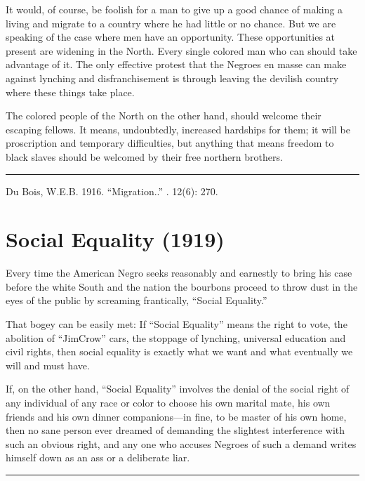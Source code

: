 \documentclass[letterpaper,10pt,english]{jupyterBook}
\begin{document}
\sphinxAtStartPar
It would, of course, be foolish for a man to give up a good chance of making a living and migrate to a country where he had little or no chance. But we are speaking of the case where men have an opportunity. These opportunities at present are widening in the North. Every single colored man who can should take advantage of it. The only effective protest that the Negroes en masse can make against lynching and dis­franchisement is through leaving the devilish country where these things take place.

\sphinxAtStartPar
The colored people of the North on the other hand, should welcome their escaping fellows. It means, undoubtedly, increased hardships for them; it will be proscription and temporary difficulties, but anything that means freedom to black slaves should be welcomed by their free northern brothers.


\bigskip\hrule\bigskip


\sphinxAtStartPar
{} Du Bois, W.E.B. 1916. “Migration..” . 12(6): 270.


\section{Social Equality (1919)}
\label{\detokenize{Volumes/19/01/social_equality:social-equality-1919}}\label{\detokenize{Volumes/19/01/social_equality::doc}}
\sphinxAtStartPar
Every time the American Negro seeks reasonably and earnestly to bring his case before the white South and the nation the bourbons proceed to throw dust in the eyes of the public by screaming frantically, “Social Equality.”

\sphinxAtStartPar
That bogey can be easily met: If “Social Equality” means the right to vote, the abolition of “Jim\sphinxhyphen{}Crow” cars, the stoppage of lynching, universal education and civil rights, then social equality is exactly what we want and what eventually we will and must have.

\sphinxAtStartPar
If, on the other hand, “Social Equality” involves the denial of the social right of any individual of any race or color to choose his own marital mate, his own friends and his own dinner companions—in fine, to be master of his own home, then no sane person ever dreamed of demanding the slightest interference with such an obvious right, and any one who accuses Negroes of such a demand writes himself down as an ass or a deliberate liar.


\bigskip\hrule\bigskip
\end{document}
